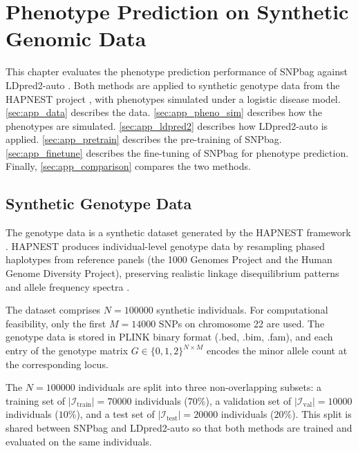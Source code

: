 \chapter{Phenotype Prediction on Synthetic Genomic Data}
\label{ch:application}

This chapter evaluates the phenotype prediction performance of SNPbag against LDpred2-auto \citep{Prive2020}. Both methods are applied to synthetic genotype data from the HAPNEST project \citep{Wharrie2023}, with phenotypes simulated under a logistic disease model. \autoref{sec:app_data} describes the data. \autoref{sec:app_pheno_sim} describes how the phenotypes are simulated. \autoref{sec:app_ldpred2} describes how LDpred2-auto is applied. \autoref{sec:app_pretrain} describes the pre-training of SNPbag. \autoref{sec:app_finetune} describes the fine-tuning of SNPbag for phenotype prediction. Finally, \autoref{sec:app_comparison} compares the two methods.

\section{Synthetic Genotype Data}
\label{sec:app_data}

The genotype data is a synthetic dataset generated by the HAPNEST framework \citep{Wharrie2023}. HAPNEST produces individual-level genotype data by resampling phased haplotypes from reference panels (the 1000 Genomes Project and the Human Genome Diversity Project), preserving realistic linkage disequilibrium patterns and allele frequency spectra \citep{Wharrie2023}.

The dataset comprises $N = 100000$ synthetic individuals. For computational feasibility, only the first $M = 14000$ SNPs on chromosome 22 are used. The genotype data is stored in PLINK binary format (.bed, .bim, .fam), and each entry of the genotype matrix $G \in \{0, 1, 2\}^{N \times M}$ encodes the minor allele count at the corresponding locus.

The $N = 100000$ individuals are split into three non-overlapping subsets: a training set of $|\mathcal{I}_{\mathrm{train}}| = 70000$ individuals ($70\%$), a validation set of $|\mathcal{I}_{\mathrm{val}}| = 10000$ individuals ($10\%$), and a test set of $|\mathcal{I}_{\mathrm{test}}| = 20000$ individuals ($20\%$). This split is shared between SNPbag and LDpred2-auto so that both methods are trained and evaluated on the same individuals.

